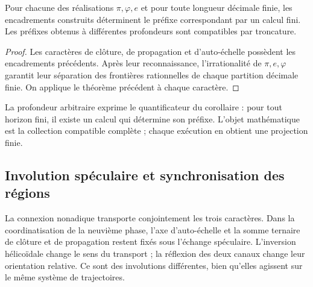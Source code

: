 \begin{corollary}
\label{gen:prefijos-regionales}
Pour chacune des réalisations \(\pi,\varphi,e\) et pour toute longueur
décimale finie, les encadrements construits déterminent le préfixe correspondant
par un calcul fini. Les préfixes obtenus à différentes profondeurs
sont compatibles par troncature.
\end{corollary}
\begin{proof}
Les caractères de clôture, de propagation et d'auto-échelle possèdent les encadrements précédents. Après leur reconnaissance, l'irrationalité de \(\pi,e,\varphi\) garantit leur séparation des frontières rationnelles de chaque partition décimale finie. On applique le théorème précédent à chaque caractère.
\end{proof}
La profondeur arbitraire exprime le quantificateur du corollaire : pour tout
horizon fini, il existe un calcul qui détermine son préfixe. L'objet
mathématique est la collection compatible complète ; chaque exécution en obtient une
projection finie.

\subsection{Involution spéculaire et synchronisation des régions}

La connexion nonadique transporte conjointement les trois caractères. Dans la coordinatisation de la neuvième phase, l'axe d'auto-échelle et la somme ternaire de clôture et de propagation restent fixés sous l'échange spéculaire. L'inversion hélicoïdale change le sens du transport ; la réflexion des deux canaux change leur orientation relative. Ce sont des involutions différentes, bien qu'elles agissent sur le même système de trajectoires.

